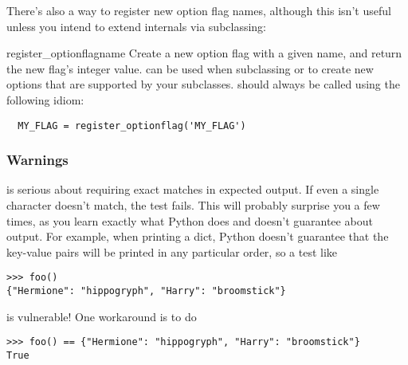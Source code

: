 
There's also a way to register new option flag names, although this
isn't useful unless you intend to extend  internals
via subclassing:

\begin{funcdesc}{register_optionflag}{name}
  Create a new option flag with a given name, and return the new
  flag's integer value.   can be
  used when subclassing  or
   to create new options that are supported by
  your subclasses.   should always be
  called using the following idiom:

\begin{verbatim}
  MY_FLAG = register_optionflag('MY_FLAG')
\end{verbatim}

\end{funcdesc}

\subsubsection{Warnings\label{doctest-warnings}}

 is serious about requiring exact matches in expected
output.  If even a single character doesn't match, the test fails.  This
will probably surprise you a few times, as you learn exactly what Python
does and doesn't guarantee about output.  For example, when printing a
dict, Python doesn't guarantee that the key-value pairs will be printed
in any particular order, so a test like

\begin{verbatim}
>>> foo()
{"Hermione": "hippogryph", "Harry": "broomstick"}
\end{verbatim}

is vulnerable!  One workaround is to do

\begin{verbatim}
>>> foo() == {"Hermione": "hippogryph", "Harry": "broomstick"}
True
\end{verbatim}

